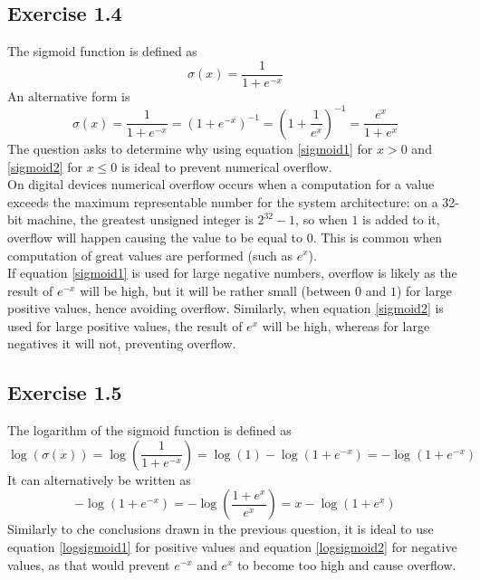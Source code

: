 \documentclass[fleqn]{article}
\begin{document}
\subsection*{Exercise 1.4}
The sigmoid function is defined as
\begin{equation}
    \label{sigmoid1}
    \sigma (x) = \frac{1}{1+e^{-x}}
\end{equation}
An alternative form is
\begin{equation}
    \sigma (x) = \frac{1}{1+e^{-x}}
    = (1+e^{-x})^{-1}
    = \left ( 1+ \frac{1}{e^x} \right ) ^{-1}
    = \frac{e^x}{1+e^x}
    \label{sigmoid2}
\end{equation}
The question asks to determine why using equation \ref{sigmoid1} for $x > 0$ and \ref{sigmoid2} for $x \le 0$ is ideal to prevent numerical overflow.\\
On digital devices numerical overflow occurs when a computation for a value exceeds the maximum representable number for the system architecture: on a 32-bit machine, the greatest unsigned integer is $2^{32} - 1$, so when $1$ is added to it, overflow will happen causing the value to be equal to $0$. This is common when computation of great values are performed (such as $e^x$).\\
If equation \ref{sigmoid1} is used for large negative numbers, overflow is likely as the result of $e^{-x}$ will be high, but it will be rather small (between $0$ and $1$) for large positive values, hence avoiding overflow. Similarly, when equation \ref{sigmoid2} is used for large positive values, the result of $e^{x}$ will be high, whereas for large negatives it will not, preventing overflow.

\subsection*{Exercise 1.5}
The logarithm of the sigmoid function is defined as
\begin{equation}
    \label{logsigmoid1}
    \log(\sigma(x)) =
    \log\left ( \frac{1}{1+e^{-x}} \right ) =
    \log(1) - \log\left (1+e^{-x} \right ) =
    - \log\left (1+e^{-x} \right ) 
\end{equation}
It can alternatively be written as
\begin{equation}
    \label{logsigmoid2}
    - \log\left (1+e^{-x} \right ) =
    - \log \left ( \frac{1+e^x}{e^x} \right ) = 
    x - \log ( 1 + e^x )
\end{equation}
Similarly to che conclusions drawn in the previous question, it is ideal to use equation \ref{logsigmoid1} for positive values and equation \ref{logsigmoid2} for negative values, as that would prevent $e^{-x}$ and $e^{x}$ to become too high and cause overflow.
\end{document}
